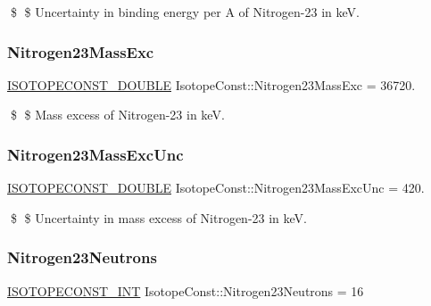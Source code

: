 \$ \$ Uncertainty in binding energy per A of Nitrogen-\/23 in keV. \mbox{\label{group___isotope_const-_nitrogen-_n23_ga0f0450d3f0539783ba3ea4b75d9c73c2}} 
\subsubsection{\texorpdfstring{Nitrogen23\+Mass\+Exc}{Nitrogen23MassExc}}
{\footnotesize\ttfamily \mbox{\hyperlink{group___isotope_const-_macros_ga8f45a7272ce02c0b4c65c44636ed719a}{I\+S\+O\+T\+O\+P\+E\+C\+O\+N\+S\+T\+\_\+\+D\+O\+U\+B\+LE}} Isotope\+Const\+::\+Nitrogen23\+Mass\+Exc = 36720.}

\$ \$ Mass excess of Nitrogen-\/23 in keV. \mbox{\label{group___isotope_const-_nitrogen-_n23_ga88e56795f0c7d4e8a3493c9cd590d99c}} 
\subsubsection{\texorpdfstring{Nitrogen23\+Mass\+Exc\+Unc}{Nitrogen23MassExcUnc}}
{\footnotesize\ttfamily \mbox{\hyperlink{group___isotope_const-_macros_ga8f45a7272ce02c0b4c65c44636ed719a}{I\+S\+O\+T\+O\+P\+E\+C\+O\+N\+S\+T\+\_\+\+D\+O\+U\+B\+LE}} Isotope\+Const\+::\+Nitrogen23\+Mass\+Exc\+Unc = 420.}

\$ \$ Uncertainty in mass excess of Nitrogen-\/23 in keV. \mbox{\label{group___isotope_const-_nitrogen-_n23_ga7a46d22f2c20957379aaa9eeaeddd4d1}} 
\subsubsection{\texorpdfstring{Nitrogen23\+Neutrons}{Nitrogen23Neutrons}}
{\footnotesize\ttfamily \mbox{\hyperlink{group___isotope_const-_macros_ga5f18360b3e99483a35c32d789e62621c}{I\+S\+O\+T\+O\+P\+E\+C\+O\+N\+S\+T\+\_\+\+I\+NT}} Isotope\+Const\+::\+Nitrogen23\+Neutrons = 16}

